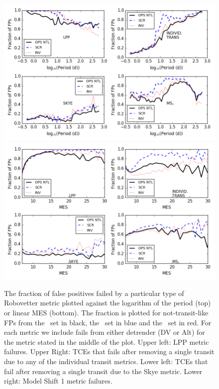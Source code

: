 \begin{figure}[h!]
    \centering
    \includegraphics[width=0.9\linewidth]{fig-fractionFailsByMetric.png}
    \includegraphics[width=0.9\linewidth]{fig-fractionFailsByMetricMes.png}
    \caption{The fraction of false positives failed by a particular type of Robovetter metric plotted against the logarithm of the period (top) or linear MES (bottom).  The fraction is plotted for not-transit-like FPs from the \opstce\ set in black, the \scrtce\ set in blue and the \invtce\ set in red. For each metric we include fails from either detrender (DV or Alt) for the metric stated in the middle of the plot. Upper left: LPP metric failures. Upper Right: TCEs that fails after removing a single transit due to any of the individual transit metrics.  Lower left: TCEs that fail after removing a single transit due to the Skye metric. Lower right: Model Shift 1 metric failures. }
    \label{f:fractionFailMetric}
\end{figure}

    
